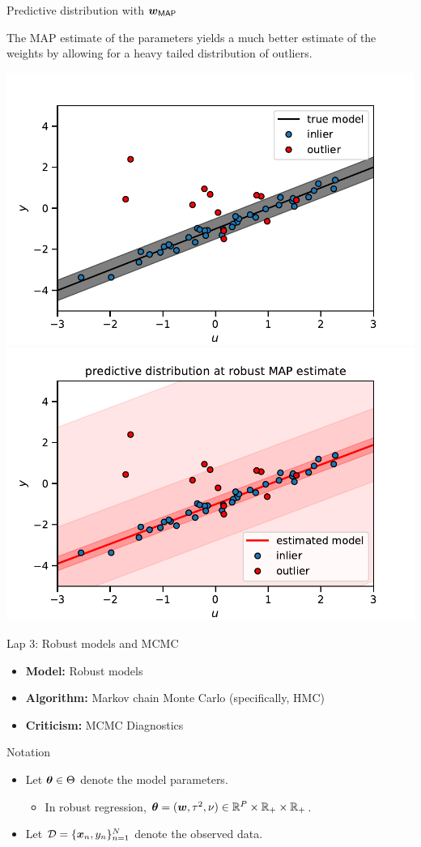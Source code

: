 \documentclass[aspectratio=169]{beamer}
\begin{document}
\begin{frame}{Predictive distribution with $\boldsymbol{w}_{\mathsf{MAP}}$}

The MAP estimate of the parameters yields a much better estimate of the weights by allowing for a heavy tailed distribution of outliers.

\centering
\includegraphics[width=.49\textwidth]{figures/lap3/data.pdf}
\includegraphics[width=.49\textwidth]{figures/lap3/robust_map_pred.pdf}
    
\end{frame}


\begin{frame}{Lap 3: Robust models and MCMC}
\begin{itemize}
    \item \textbf{Model:} Robust models
    \item \textbf{Algorithm:} Markov chain Monte Carlo (specifically, HMC)
    \item \textbf{Criticism:} MCMC Diagnostics
\end{itemize}
\end{frame}

\begin{frame}{Notation}
\begin{itemize}
    \item Let $\boldsymbol{\theta} \in \Theta$ denote the model parameters. 
    \begin{itemize}
        \item In robust regression, $\boldsymbol{\theta} = (\boldsymbol{w}, \tau^2, \nu) \in \mathbb{R}^P \times \mathbb{R}_+ \times \mathbb{R}_+$.
    \end{itemize}
    
    \item Let $\mathcal{D} = \{\boldsymbol{x}_n, y_n\}_{n=1}^N$ denote the observed data.
\end{itemize}
    
\end{frame}
\end{document}

